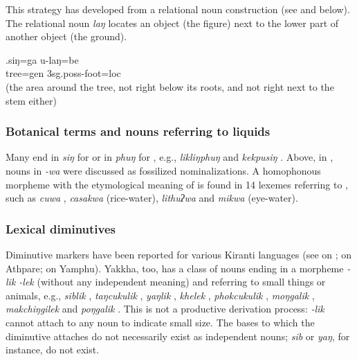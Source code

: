 This  strategy has developed from a relational noun construction (see \Next and  below). The relational noun \emph{laŋ} locates an object (the {\sc figure}) next to the lower part of another object (the {\sc ground}). 

\exg.siŋ=ga u-laŋ=be\\
tree{\sc =gen} {\sc 3sg.poss-}foot{\sc =loc}\\
 (the area around the tree, not right below its roots, and not right next to the stem either)


\subsubsection{Botanical terms and nouns referring to liquids}

Many  end in \emph{siŋ} for  or in \emph{phuŋ} for , e.g., \emph{likliŋphuŋ}  and \emph{kekpusiŋ} . Above, in , nouns in \emph{-wa} were discussed as fossilized nominalizations. A homophonous morpheme with the etymological meaning of  is found in 14 lexemes referring to , such as  \emph{cuwa} , \emph{casakwa}  (rice-water), \emph{lithuʔwa}  and \emph{mikwa}  (eye-water). 


\subsubsection{Lexical diminutives}

Diminutive markers have been reported for various Kiranti languages (see \citealt[67]{Doornenbal2009A-grammar} on ; \citealt[95]{Ebert1997A-grammar} on Athpare; \citealt[85]{Rutgers1998Yamphu} on Yamphu). Yakkha, too, has a class of nouns ending in a morpheme \emph{-lik \ti -lek} (without any independent meaning) and referring to small things or animals, e.g., \emph{siblik} , \emph{taŋcukulik} , \emph{yaŋlik} , \emph{khelek} , \emph{phokcukulik} , \emph{moŋgalik} , \emph{makchiŋgilek}  and \emph{poŋgalik} . This is not a productive derivation process: \emph{-lik} cannot attach to any noun to indicate small size. The bases to which the diminutive attaches do not necessarily exist as independent nouns; \emph{sib} or \emph{yaŋ}, for instance, do not exist.


